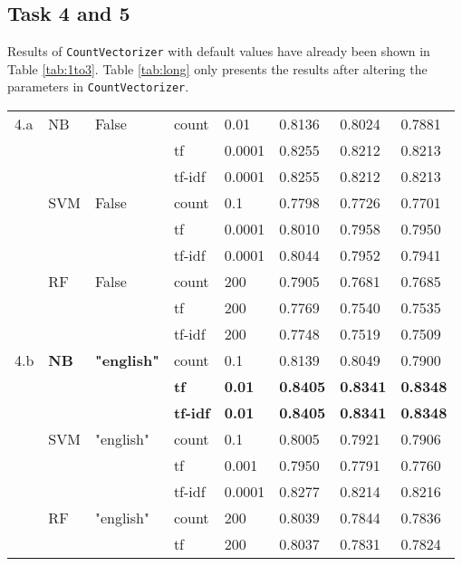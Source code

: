 \documentclass[12pt]{article}
\begin{document}
\subsection{Task 4 and 5}
Results of \texttt{CountVectorizer} with default values have already been shown in Table \ref{tab:1to3}. Table \ref{tab:long} only presents the results after altering the parameters in \texttt{CountVectorizer}.
\tabletail{\bottomrule}
\label{tab:long}
\begin{center}
\begin{supertabular}{llllllll}
        4.a & NB & False & count & 0.01 & 0.8136 & 0.8024 & 0.7881\\
            &&& tf & 0.0001 & 0.8255 & 0.8212 & 0.8213 \\
            &&& tf-idf & 0.0001 & 0.8255 & 0.8212 & 0.8213 \\
            & SVM & False & count & 0.1 & 0.7798 & 0.7726 & 0.7701\\ 
            &&& tf & 0.0001 & 0.8010 & 0.7958 & 0.7950\\
            &&& tf-idf & 0.0001 & 0.8044 & 0.7952 & 0.7941\\
            & RF & False & count & 200 & 0.7905 & 0.7681 & 0.7685\\
            &&& tf & 200 & 0.7769 & 0.7540 & 0.7535\\
            &&& tf-idf & 200 & 0.7748 & 0.7519 & 0.7509\\
        4.b & \textbf{NB} & \textbf{"english"} & count & 0.1 & 0.8139 & 0.8049 & 0.7900\\
            &&& \textbf{tf} & \textbf{0.01} & \textbf{0.8405} & \textbf{0.8341} & \textbf{0.8348}\\
            &&& \textbf{tf-idf} & \textbf{0.01} & \textbf{0.8405} & \textbf{0.8341} & \textbf{0.8348}\\
            & SVM & "english" & count & 0.1 & 0.8005 & 0.7921 & 0.7906\\
            &&& tf & 0.001 & 0.7950 & 0.7791 & 0.7760\\
            &&& tf-idf & 0.0001 & 0.8277 & 0.8214 & 0.8216\\
            & RF & "english" & count & 200 & 0.8039 & 0.7844 & 0.7836\\
            &&& tf & 200 & 0.8037 & 0.7831 & 0.7824\\

\end{supertabular}
\end{center}
\end{document}
